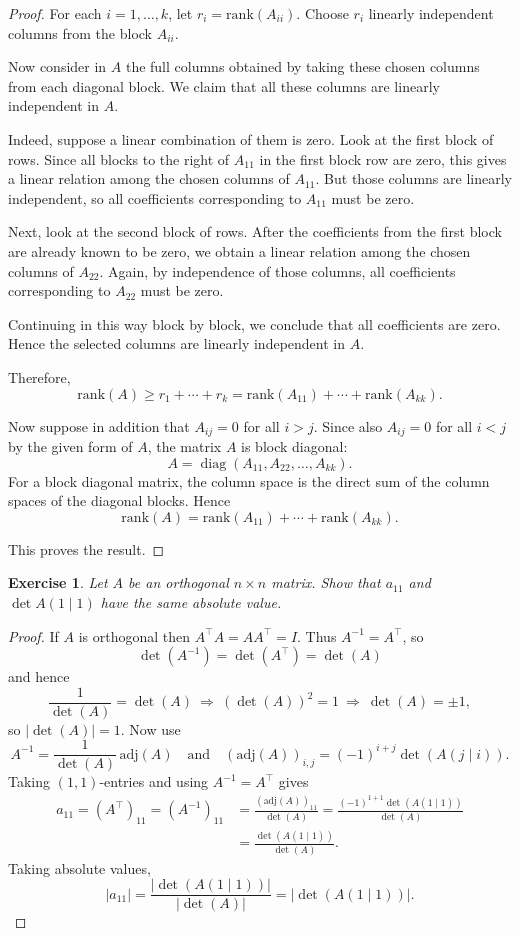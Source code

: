 \documentclass[11pt]{article}
\newcommand{\rank}{\mathrm{rank}}
\newcommand{\adj}{\mathrm{adj}}
\newtheorem{exercise}{Exercise}[section]
\theoremstyle{definition}
\begin{document}
\begin{proof}
For each $i=1,\dots,k$, let $r_i=\rank(A_{ii})$.  
Choose $r_i$ linearly independent columns from the block $A_{ii}$.

Now consider in $A$ the full columns obtained by taking these chosen columns from each diagonal block.  
We claim that all these columns are linearly independent in $A$.

Indeed, suppose a linear combination of them is zero. Look at the first block of rows.  
Since all blocks to the right of $A_{11}$ in the first block row are zero, this gives a linear relation among the chosen columns of $A_{11}$.  
But those columns are linearly independent, so all coefficients corresponding to $A_{11}$ must be zero.

Next, look at the second block of rows. After the coefficients from the first block are already known to be zero, we obtain a linear relation among the chosen columns of $A_{22}$.  
Again, by independence of those columns, all coefficients corresponding to $A_{22}$ must be zero.

Continuing in this way block by block, we conclude that all coefficients are zero.  
Hence the selected columns are linearly independent in $A$.

Therefore,
\[
\rank(A)\ge r_1+\cdots+r_k
=\rank(A_{11})+\cdots+\rank(A_{kk}).
\]

Now suppose in addition that $A_{ij}=0$ for all $i>j$. Since also $A_{ij}=0$ for all $i<j$ by the given form of $A$, the matrix $A$ is block diagonal:
\[
A=\operatorname{diag}(A_{11},A_{22},\dots,A_{kk}).
\]
For a block diagonal matrix, the column space is the direct sum of the column spaces of the diagonal blocks. Hence
\[
\rank(A)=\rank(A_{11})+\cdots+\rank(A_{kk}).
\]

This proves the result.
\end{proof}

\begin{exercise}
Let $A$ be an orthogonal $n\times n$ matrix. Show that $a_{11}$ and $\det A(1\mid 1)$ have the
same absolute value.
\end{exercise}
\begin{proof}
If $A$ is orthogonal then $A^\top A=AA^\top =I$. Thus $A^{-1} = A^\top$, so
\[
\det(A^{-1})=\det(A^\top)=\det(A)
\]
and hence
\[
\frac{1}{\det(A)}=\det(A)\ \Longrightarrow\ (\det(A))^2=1\ \Longrightarrow\ \det(A)=\pm 1,
\]
so $|\det(A)|=1$.
Now use
\[
A^{-1}=\frac{1}{\det(A)}\,\adj(A)
\quad\text{and}\quad
(\adj(A))_{i,j}=(-1)^{i+j}\det(A(j\mid i)).
\]
Taking $(1,1)$-entries and using $A^{-1}=A^\top$ gives
\begin{align*}
a_{11}=(A^\top)_{11}=(A^{-1})_{11}
&=\frac{(\adj(A))_{11}}{\det(A)}
=\frac{(-1)^{1+1}\det(A(1\mid 1))}{\det(A)}\\
&=\frac{\det(A(1\mid 1))}{\det(A)}.
\end{align*}
Taking absolute values,
\[
|a_{11}|=\frac{|\det(A(1\mid 1))|}{|\det(A)|}=|\det(A(1\mid 1))|.
\]
\end{proof}
\end{document}
